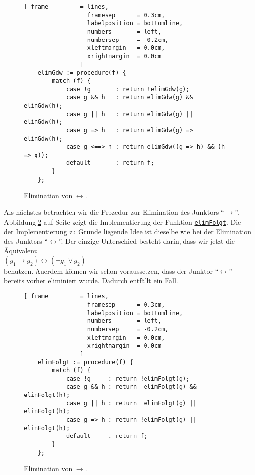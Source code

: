 \begin{figure}[!ht]
  \centering
\begin{Verbatim}[ frame         = lines, 
                  framesep      = 0.3cm, 
                  labelposition = bottomline,
                  numbers       = left,
                  numbersep     = -0.2cm,
                  xleftmargin   = 0.0cm,
                  xrightmargin  = 0.0cm
                ]
    elimGdw := procedure(f) {
        match (f) {
            case !g       : return !elimGdw(g);
            case g && h   : return elimGdw(g) && elimGdw(h);
            case g || h   : return elimGdw(g) || elimGdw(h);
            case g => h   : return elimGdw(g) => elimGdw(h);
            case g <==> h : return elimGdw((g => h) && (h => g));
            default       : return f; 
        }
    };
\end{Verbatim}
\vspace*{-0.3cm}
  \caption{Elimination von $\leftrightarrow$.}
  \label{fig:eliminate-gdw}
\end{figure} 

Als n\"{a}chstes betrachten wir die Prozedur zur Elimination des Junktors ``$\rightarrow$''. 
Abbildung
\ref{fig:eliminate-folgt} auf Seite \pageref{fig:eliminate-folgt} zeigt die
Implementierung der Funktion
\href{https://github.com/karlstroetmann/Logik/blob/master/SetlX/knf.stlx}{\texttt{elimFolgt}}.
Die der Implementierung zu Grunde liegende Idee ist dieselbe wie bei der Elimination des
Junktors ``$\leftrightarrow$''.  Der einzige Unterschied besteht darin, dass wir jetzt die
Ãquivalenz \\[0.2cm]
\hspace*{1.3cm} $(g_1 \rightarrow g_2) \leftrightarrow (\neg g_1 \vee g_2)$ \\[0.2cm]
benutzen.  Au\3erdem k\"{o}nnen wir schon voraussetzen, dass der Junktor ``$\leftrightarrow$''
bereits vorher eliminiert wurde.  Dadurch entf\"{a}llt ein Fall.

\begin{figure}[!ht]
  \centering
\begin{Verbatim}[ frame         = lines, 
                  framesep      = 0.3cm, 
                  labelposition = bottomline,
                  numbers       = left,
                  numbersep     = -0.2cm,
                  xleftmargin   = 0.0cm,
                  xrightmargin  = 0.0cm
                ]
    elimFolgt := procedure(f) {
        match (f) {
            case !g     : return !elimFolgt(g);
            case g && h : return  elimFolgt(g) && elimFolgt(h);
            case g || h : return  elimFolgt(g) || elimFolgt(h);
            case g => h : return !elimFolgt(g) || elimFolgt(h);
            default     : return f; 
        }
    };
\end{Verbatim}
\vspace*{-0.3cm}
  \caption{Elimination von $\rightarrow$.}
  \label{fig:eliminate-folgt}
\end{figure}
 
